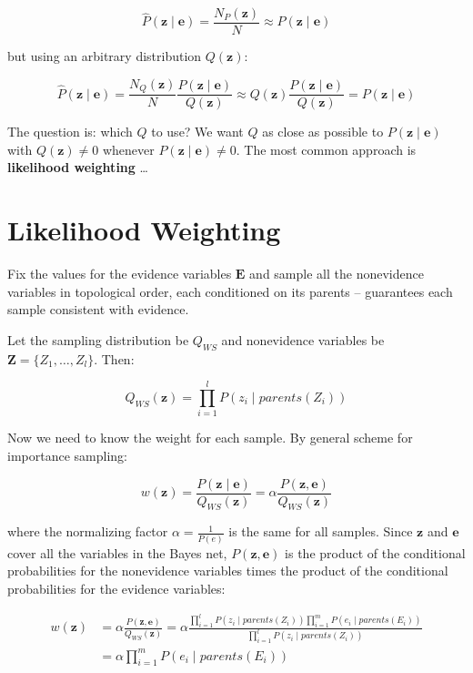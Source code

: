 \documentclass[11pt]{article}
\begin{document}
\vspace{-.1in}
\[
\hat{P} (\bm{z} \mid \bm{e}) = \frac{ N_P (\bm{z}) }{ N } \approx P(\bm{z} \mid \bm{e})
\]

but using an arbitrary distribution \(Q(\bm{z})\):

\[
\hat{P} (\bm{z} \mid \bm{e}) =
\frac{ N_Q (\bm{z}) }{ N } \frac{ P(\bm{z} \mid \bm{e}) }{ Q(\bm{z}) }  \approx
Q(\bm{z}) \frac{ P(\bm{z} \mid \bm{e}) }{ Q(\bm{z}) } =
P(\bm{z} \mid \bm{e})
\]

The question is: which \(Q\) to use?  We want \(Q\) as close as possible to \(P(\bm{z} \mid \bm{e})\) with \(Q(\bm{z}) \ne 0\) whenever \(P(\bm{z} \mid \bm{e}) \ne 0\).  The most common approach is \textbf{likelihood weighting} \ldots{}
\section{Likelihood Weighting}
\label{sec:org944645b}

Fix the values for the evidence variables \(\bm{E}\) and sample all the nonevidence variables in topological order, each conditioned on its parents -- guarantees each sample consistent with evidence.

Let the sampling distribution be \(Q_{WS}\) and nonevidence variables be \(\bm{Z} = \{ Z_1, \dots, Z_l \}\). Then:

\vspace{-.2in}
\[
Q_{WS}(\bm{z}) = \prod_{i = 1}^l P(z_i \mid parents(Z_i))
\]

Now we need to know the weight for each sample.  By general scheme for importance sampling:

\vspace{-.1in}
\[
w(\bm{z}) = \frac{ P(\bm{z}\mid \bm{e}) }{ Q_{WS}(\bm{z}) } = \alpha \frac{ P(\bm{z},\bm{e}) }{ Q_{WS}(\bm{z}) }
\]

where the normalizing factor \(\alpha = \frac{1}{P(e)}\) is the same for all samples.  Since \(\bm{z}\) and \(\bm{e}\) cover all the variables in the Bayes net, \(P(\bm{z}, \bm{e})\) is the product of the conditional probabilities for the nonevidence variables times the product of the conditional probabilities for the evidence variables:

\vspace{-.2in}
\begin{align*}
w(\bm{z}) &= \alpha \frac{ P(\bm{z},\bm{e}) }{ Q_{WS}(\bm{z}) }
          = \alpha \frac{ \prod_{i = 1}^l P(z_i \mid parents(Z_i)) \prod_{i = 1}^m P(e_i \mid parents(E_i))  }
          { \prod_{i = 1}^l P(z_i \mid parents(Z_i))  }\\
          &= \alpha \prod_{i = 1}^m P(e_i \mid parents(E_i)) \tag{14.9}
\end{align*}
\end{document}

